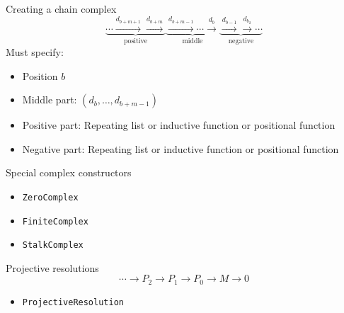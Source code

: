 \begin{frame}{Creating a chain complex}{}
{\large
\[
\underbrace{
  \cdots \xrightarrow{d_{b+m+1}}
  \xrightarrow{d_{b+m}}
}_{\text{positive}}
\underbrace{
  \xrightarrow{d_{b+m-1}} \cdots
  \xrightarrow{d_b}
}_{\text{middle}}
\underbrace{
  \xrightarrow{d_{b-1}} \xrightarrow{d_{b_2}}
  \cdots
}_{\text{negative}}
\]
}
Must specify:
\begin{itemize}
\item Position $b$
\item Middle part: $(d_b, \ldots, d_{b+m-1})$
\item Positive part: Repeating list or inductive function or
positional function
\item Negative part: Repeating list or inductive function or
positional function
\end{itemize}
\end{frame}

\begin{frame}{Special complex constructors}
\begin{itemize}
\item \texttt{ZeroComplex}
\item \texttt{FiniteComplex}
\item \texttt{StalkComplex}
\end{itemize}
\end{frame}

\begin{frame}{Projective resolutions}
\[
\cdots \to P_2 \to P_1 \to P_0 \to M \to 0
\]
\begin{itemize}
\item \texttt{ProjectiveResolution}
\end{itemize}
\end{frame}




